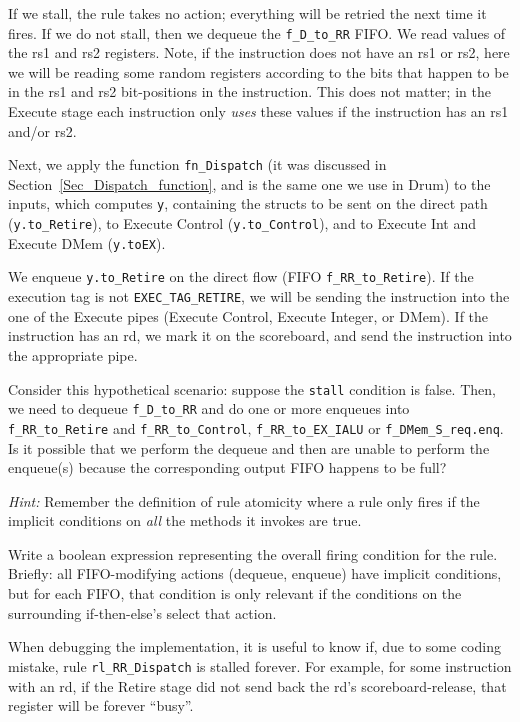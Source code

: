 If we stall, the rule takes no action; everything will be retried the
next time it fires.  If we do not stall, then we dequeue the
\verb|f_D_to_RR| FIFO.  We read values of the rs1 and rs2 registers.
Note, if the instruction does not have an rs1 or rs2, here we will be
reading some random registers according to the bits that happen to be
in the rs1 and rs2 bit-positions in the instruction.  This does not
matter; in the Execute stage each instruction only \emph{uses} these
values if the instruction has an rs1 and/or rs2.

Next, we apply the function \verb|fn_Dispatch| (it was discussed in
Section~\ref{Sec_Dispatch_function}, and is the same one we use in Drum) to
the inputs, which computes \verb|y|, containing the structs to be sent
on the direct path (\verb|y.to_Retire|), to Execute Control
(\verb|y.to_Control|), and to Execute Int and Execute DMem
(\verb|y.toEX|).

We enqueue \verb|y.to_Retire| on the direct flow (FIFO
\verb|f_RR_to_Retire|).  If the execution tag is not
\verb|EXEC_TAG_RETIRE|, we will be sending the instruction into the
one of the Execute pipes (Execute Control, Execute Integer, or DMem).
If the instruction has an rd, we mark it on the scoreboard, and send
the instruction into the appropriate pipe.

\hdivider

\Exercise

Consider this hypothetical scenario: suppose the \verb|stall|
condition is false.  Then, we need to dequeue \verb|f_D_to_RR| and do
one or more enqueues into \verb|f_RR_to_Retire| and
\verb|f_RR_to_Control|, \verb|f_RR_to_EX_IALU| or
\verb|f_DMem_S_req.enq|.  Is it possible that we perform the dequeue
and then are unable to perform the enqueue(s) because the
corresponding output FIFO happens to be full?

\emph{Hint:} Remember the definition of rule atomicity where a rule
only fires if the implicit conditions on \emph{all} the methods it
invokes are true.

\Exercise

Write a boolean expression representing the overall firing condition
for the rule.  Briefly: all FIFO-modifying actions (dequeue, enqueue)
have implicit conditions, but for each FIFO, that condition is only
relevant if the conditions on the surrounding if-then-else's select
that action.

\Exercise

When debugging the implementation, it is useful to know if, due to
some coding mistake, rule \verb|rl_RR_Dispatch| is stalled forever.
For example, for some instruction with an rd, if the Retire stage did
not send back the rd's scoreboard-release, that register will be
forever ``busy''.

